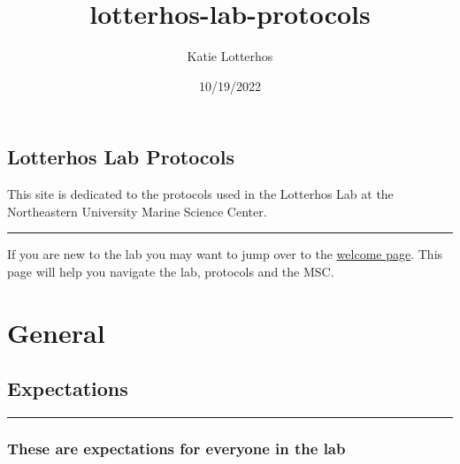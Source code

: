 \documentclass[
  letterpaper,
  DIV=11,
  numbers=noendperiod]{scrreprt}
\title{lotterhos-lab-protocols}
\author{Katie Lotterhos}
\date{10/19/2022}
\renewcommand*\contentsname{Table of contents}
\newcommand\contentsname{Table of contents}
\begin{document}
\maketitle
\ifdefined\Shaded\renewenvironment{Shaded}{\begin{tcolorbox}[borderline west={3pt}{0pt}{shadecolor}, enhanced, breakable, interior hidden, frame hidden, sharp corners, boxrule=0pt]}{\end{tcolorbox}}\fi

\renewcommand*\contentsname{Table of contents}
{
\hypersetup{linkcolor=}
\setcounter{tocdepth}{2}
\tableofcontents
}

\hypertarget{lotterhos-lab-protocols}{%
\chapter*{Lotterhos Lab Protocols}\label{lotterhos-lab-protocols}}

This site is dedicated to the protocols used in the Lotterhos Lab at the
Northeastern University Marine Science Center.

\begin{center}\rule{0.5\linewidth}{0.5pt}\end{center}

If you are new to the lab you may want to jump over to the
\href{https://drk-lo.github.io/lotterhoslabprotocols/welcome/}{welcome
page}. This page will help you navigate the lab, protocols and the MSC.

\part{General}

\hypertarget{expectations}{%
\chapter{Expectations}\label{expectations}}

\begin{center}\rule{0.5\linewidth}{0.5pt}\end{center}

\hypertarget{these-are-expectations-for-everyone-in-the-lab}{%
\section*{\texorpdfstring{\textbf{These are expectations for everyone in
the
lab}}{These are expectations for everyone in the lab}}\label{these-are-expectations-for-everyone-in-the-lab}}
\end{document}
